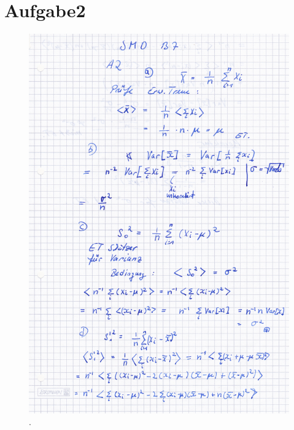 \section{Aufgabe2}
\label{a2}

\begin{figure}
  \centering
  \includegraphics[width=\textwidth]{pictures/bild21.jpg}
  \caption{.}
  \label{fig:bild21}
\end{figure}

